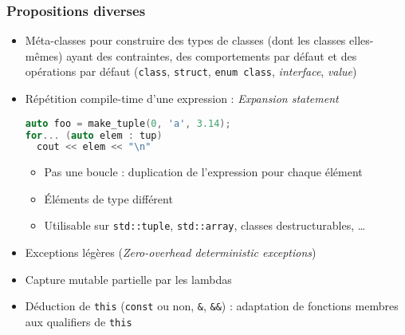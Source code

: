 \documentclass[C++.tex]{subfiles}
\begin{document}
\begin{frame}[fragile]
	\frametitle{Propositions diverses}
	\begin{itemize}
		\item Méta-classes pour construire des types de classes (dont les classes elles-mêmes) ayant des contraintes, des comportements par défaut et des opérations par défaut (\lstinline|class|, \lstinline|struct|, \lstinline|enum class|, \textit{interface}, \textit{value})
		\item Répétition compile-time d'une expression : \textit{Expansion statement}
		
			\begin{lstlisting}[language=C++]
auto foo = make_tuple(0, 'a', 3.14);
for... (auto elem : tup)  
  cout << elem << "\n"\end{lstlisting}
			
			\begin{itemize}
				\item Pas une boucle : duplication de l'expression pour chaque élément
				\item Éléments de type différent
				\item Utilisable sur \lstinline|std::tuple|, \lstinline|std::array|, classes destructurables, \ldots
			\end{itemize}
		\item Exceptions légères (\textit{Zero-overhead deterministic exceptions})
		\item Capture mutable partielle par les lambdas
		\item Déduction de \lstinline|this| (\lstinline|const| ou non, \lstinline|&|, \lstinline|&&|) : adaptation de fonctions membres aux qualifiers de \lstinline|this|


	\end{itemize}
\end{frame}
\end{document}
